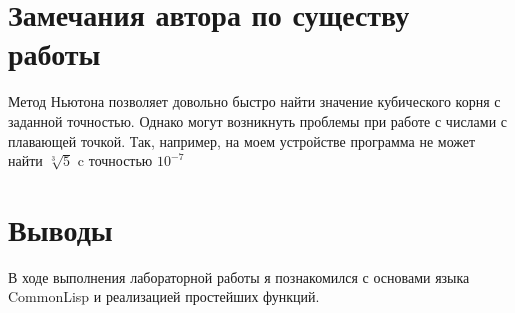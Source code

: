 \documentclass[12pt]{article}
\begin{document}
\section{Замечания автора по существу работы}

Метод Ньютона позволяет довольно быстро найти значение кубического корня с заданной точностью. Однако могут возникнуть проблемы при работе с числами с плавающей точкой. Так, например, на моем устройстве программа не может найти $\sqrt[3]{5}$ c точностью $10^{-7}$

\section{Выводы}
В ходе выполнения лабораторной работы я познакомился с основами языка CommonLisp и реализацией простейших функций.
\end{document}
